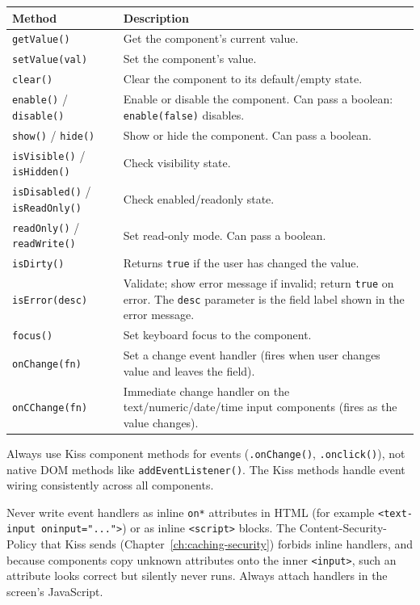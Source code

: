 \begin{longtable}{P{4.8cm}P{5.7cm}}
\toprule
\textbf{Method} & \textbf{Description} \\
\midrule
\endhead
\texttt{getValue()} & Get the component's current value. \\
\texttt{setValue(val)} & Set the component's value. \\
\texttt{clear()} & Clear the component to its default/empty state. \\
\texttt{enable()} / \texttt{disable()} & Enable or disable the component. Can pass a boolean: \texttt{enable(false)} disables. \\
\texttt{show()} / \texttt{hide()} & Show or hide the component. Can pass a boolean. \\
\texttt{isVisible()} / \texttt{isHidden()} & Check visibility state. \\
\texttt{isDisabled()} / \texttt{isReadOnly()} & Check enabled/readonly state. \\
\texttt{readOnly()} / \texttt{readWrite()} & Set read-only mode. Can pass a boolean. \\
\texttt{isDirty()} & Returns \texttt{true} if the user has changed the value. \\
\texttt{isError(desc)} & Validate; show error message if invalid; return \texttt{true} on error. The \texttt{desc} parameter is the field label shown in the error message. \\
\texttt{focus()} & Set keyboard focus to the component. \\
\texttt{onChange(fn)} & Set a change event handler (fires when user changes value and leaves the field). \\
\texttt{onCChange(fn)} & Immediate change handler on the text/numeric/date/time input components (fires as the value changes). \\
\bottomrule
\end{longtable}

\begin{warnbox}
Always use Kiss component methods for events (\texttt{.onChange()}, \texttt{.onclick()}), not native DOM methods like \texttt{addEventListener()}.  The Kiss methods handle event wiring consistently across all components.

Never write event handlers as inline \texttt{on*} attributes in HTML (for example \texttt{<text-input oninput="...">}) or as inline \texttt{<script>} blocks.  The Content-Security-Policy that Kiss sends (Chapter~\ref{ch:caching-security}) forbids inline handlers, and because components copy unknown attributes onto the inner \texttt{<input>}, such an attribute looks correct but silently never runs.  Always attach handlers in the screen's JavaScript.
\end{warnbox}

